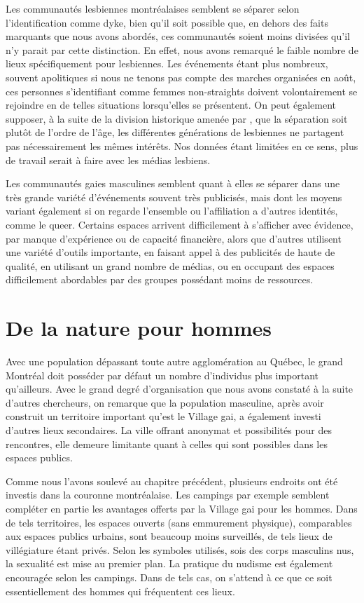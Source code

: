 Les communautés lesbiennes montréalaises semblent se séparer selon l'identification comme dyke, bien qu'il soit possible que, en dehors des faits marquants que nous avons abordés, ces communautés soient moins divisées qu'il n'y parait par cette distinction.
En effet, nous avons remarqué le faible nombre de lieux spécifiquement pour lesbiennes.
Les événements étant plus nombreux, souvent apolitiques si nous ne tenons pas compte des marches organisées en août, ces personnes s'identifiant comme femmes non-straights doivent volontairement se rejoindre en de telles situations lorsqu'elles se présentent.
On peut également supposer, à la suite de la division historique amenée par \citet{Giraud2014}, que la séparation soit plutôt de l'ordre de l'âge, les différentes générations de lesbiennes ne partagent pas nécessairement les mêmes intérêts.
Nos données étant limitées en ce sens, plus de travail serait à faire avec les médias lesbiens.

Les communautés gaies masculines semblent quant à elles se séparer dans une très grande variété d'événements souvent très publicisés, mais dont les moyens variant également si on regarde l'ensemble ou l'affiliation a d'autres identités, comme le queer.
Certains espaces arrivent difficilement à s'afficher avec évidence, par manque d'expérience ou de capacité financière, alors que d'autres utilisent une variété d'outils importante, en faisant appel à des publicités de haute de qualité, en utilisant un grand nombre de médias, ou en occupant des espaces difficilement abordables par des groupes possédant moins de ressources.

\section{De la nature pour hommes}
\label{sec:de_la_nature_pour_hommes}
Avec une population dépassant toute autre agglomération au Québec, le grand Montréal doit posséder par défaut un nombre d'individus \lgbt{} plus important qu'ailleurs.
Avec le grand degré d'organisation que nous avons constaté à la suite d'autres chercheurs, on remarque que la population masculine, après avoir construit un territoire important qu'est le Village gai, a également investi d'autres lieux secondaires.
La ville offrant anonymat et possibilités pour des rencontres, elle demeure limitante quant à celles qui sont possibles dans les espaces publics.

Comme nous l'avons soulevé au chapitre précédent, plusieurs endroits ont été investis dans la couronne montréalaise.
Les campings par exemple semblent compléter en partie les avantages offerts par la Village gai pour les hommes.
Dans de tels territoires, les espaces ouverts (sans emmurement physique), comparables aux espaces publics urbains, sont beaucoup moins surveillés, de tels lieux de villégiature étant  privés.
Selon les symboles utilisés, sois des corps masculins nus, la sexualité est mise au premier plan.
La pratique du nudisme est également encouragée selon les campings.
Dans de tels cas, on s'attend à ce que ce soit essentiellement des hommes qui fréquentent ces lieux.

